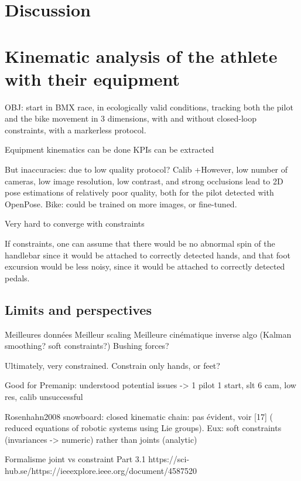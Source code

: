 \FloatBarrier
\section{Discussion}
\section{Kinematic analysis of the athlete with their equipment}

OBJ: start in BMX race, in ecologically valid conditions, tracking both the pilot and the bike movement in 3 dimensions, with and without closed-loop constraints, with a markerless protocol.


Equipment kinematics can be done
KPIs can be extracted

But inaccuracies: due to low quality protocol? Calib +However, low number of cameras, low image resolution, low contrast, and strong occlusions lead to 2D pose estimations of relatively poor quality, both for the pilot detected with OpenPose. Bike: could be trained on more images, or fine-tuned.


Very hard to converge with constraints






If constraints, one can assume that there would be no abnormal spin of the handlebar since it would be attached to correctly detected hands, and that foot excursion would be less noisy, since it would be attached to correctly detected pedals.



\subsection{Limits and perspectives}



Meilleures données
Meilleur scaling
Meilleure cinématique inverse algo (Kalman smoothing? soft constraints?)
Bushing forces?

Ultimately, very constrained. Constrain only hands, or feet?


Good for Premanip: understood potential issues ->
1 pilot 1 start, slt 6 cam, low res, calib unsuccessful


Rosenhahn2008 snowboard: closed kinematic chain: pas évident, voir [17] ( reduced equations of robotic systems using Lie groups). Eux: soft constraints (invariances -> numeric) rather than joints (analytic)

Formalisme joint vs constraint Part 3.1 https://sci-hub.se/https://ieeexplore.ieee.org/document/4587520


